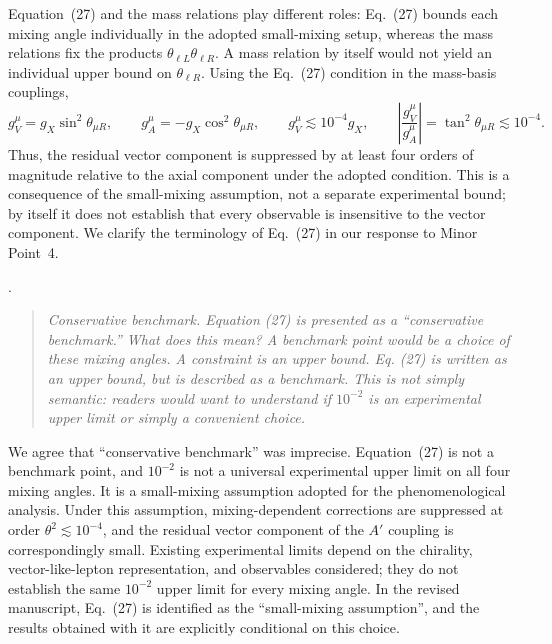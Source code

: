 \documentclass[12pt,a4paper]{article}
\begin{document}
Equation~(27) and the mass relations play different roles: Eq.~(27) bounds each mixing angle individually in the adopted small-mixing setup, whereas the mass relations fix the products \(\theta_{\ell L}\theta_{\ell R}\). A mass relation by itself would not yield an individual upper bound on \(\theta_{\ell R}\). Using the Eq.~(27) condition in the mass-basis couplings,
\[
g_V^\mu=g_X\sin^2\theta_{\mu R},
\qquad
g_A^\mu=-g_X\cos^2\theta_{\mu R},
\qquad
g_V^\mu\lesssim10^{-4}g_X,\qquad \left|\frac{g_V^\mu}{g_A^\mu}\right|=\tan^2\theta_{\mu R}\lesssim10^{-4}.
\]
Thus, the residual vector component is suppressed by at least four orders of magnitude relative to the axial component under the adopted condition. This is a consequence of the small-mixing assumption, not a separate experimental bound; by itself it does not establish that every observable is insensitive to the vector component. We clarify the terminology of Eq.~(27) in our response to Minor Point~4.

\medskip
{}.
\begin{quote}\itshape
Conservative benchmark. Equation (27) is presented as a ``conservative benchmark.'' What does this mean? A benchmark point would be a choice of these mixing angles. A constraint is an upper bound. Eq. (27) is written as an upper bound, but is described as a benchmark. This is not simply semantic: readers would want to understand if \(10^{-2}\) is an experimental upper limit or simply a convenient choice.
\end{quote}

We agree that ``conservative benchmark'' was imprecise. Equation~(27) is not a benchmark point, and \(10^{-2}\) is not a universal experimental upper limit on all four mixing angles. It is a small-mixing assumption adopted for the phenomenological analysis. Under this assumption, mixing-dependent corrections are suppressed at order \(\theta^2\lesssim10^{-4}\), and the residual vector component of the \(A'\) coupling is correspondingly small. Existing experimental limits depend on the chirality, vector-like-lepton representation, and observables considered; they do not establish the same \(10^{-2}\) upper limit for every mixing angle. In the revised manuscript, Eq.~(27) is identified as the ``small-mixing assumption'', and the results obtained with it are explicitly conditional on this choice.
\end{document}
